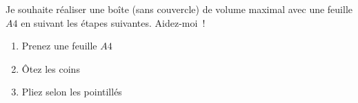 \probleme Je souhaite réaliser une boîte (sans couvercle) de volume maximal avec une feuille $A4$ en suivant les étapes suivantes. Aidez-moi~!

\begin{enumerate}
	\item Prenez une feuille $A4$
	\item Ôtez les coins
	\item Pliez selon les pointillés
\end{enumerate}

\begin{center}
	
\end{center}